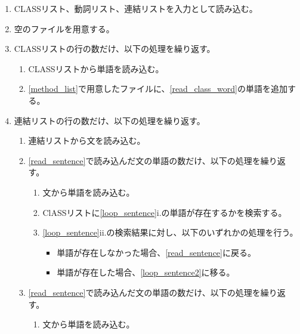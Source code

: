 \begin{enumerate}
    \item CLASSリスト、動詞リスト、連結リストを入力として読み込む。
    \item 空のファイルを用意する。
    \label{method_list}
    \item CLASSリストの行の数だけ、以下の処理を繰り返す。
        \begin{enumerate}
            \item CLASSリストから単語を読み込む。
            \label{read_class_word}
            \item \ref{method_list}で用意したファイルに、\ref{read_class_word}の単語を追加する。
        \end{enumerate}
    \item 連結リストの行の数だけ、以下の処理を繰り返す。
    \label{loop_connect_list}
        \begin{enumerate}
            \item 連結リストから文を読み込む。
            \label{read_sentence}
            \item \ref{read_sentence}で読み込んだ文の単語の数だけ、以下の処理を繰り返す。
            \label{loop_sentence}
                \begin{enumerate}
                    \item 文から単語を読み込む。
                    \label{read_word_for_class}
                    \item ClASSリストに\ref{loop_sentence}i.の単語が存在するかを検索する。
                    \label{search_class_word}
                    \item \ref{loop_sentence}ii.の検索結果に対し、以下のいずれかの処理を行う。
                        \begin{itemize}
                            \item 単語が存在しなかった場合、\ref{read_sentence}に戻る。
                            \item 単語が存在した場合、\ref{loop_sentence2}に移る。
                        \end{itemize}
                \end{enumerate}
            \item \ref{read_sentence}で読み込んだ文の単語の数だけ、以下の処理を繰り返す。
            \label{loop_sentence2}
                \begin{enumerate}
                    \item 文から単語を読み込む。
                    \label{read_word_for_method}

\end{enumerate}
\end{enumerate}
\end{enumerate}
